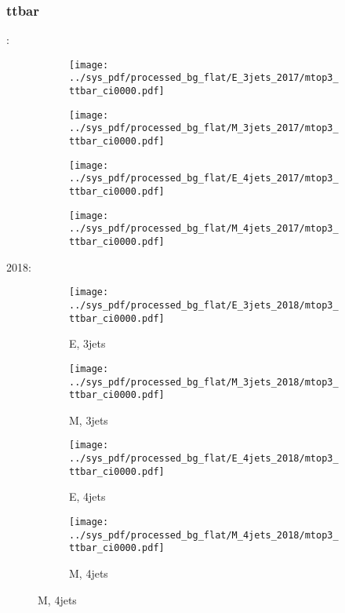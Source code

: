 \documentclass{beamer}
\begin{document}
\begin{frame}
\frametitle{ttbar}
\fontsize{5}{1}:
\begin{figure}
\centering
\begin{subfigure}[b]{0.24\textwidth}
\texttt{[image: ../sys\_pdf/processed\_bg\_flat/E\_3jets\_2017/mtop3\_ttbar\_ci0000.pdf]}
\end{subfigure}
\begin{subfigure}[b]{0.24\textwidth}
\texttt{[image: ../sys\_pdf/processed\_bg\_flat/M\_3jets\_2017/mtop3\_ttbar\_ci0000.pdf]}
\end{subfigure}
\begin{subfigure}[b]{0.24\textwidth}
\texttt{[image: ../sys\_pdf/processed\_bg\_flat/E\_4jets\_2017/mtop3\_ttbar\_ci0000.pdf]}
\end{subfigure}
\begin{subfigure}[b]{0.24\textwidth}
\texttt{[image: ../sys\_pdf/processed\_bg\_flat/M\_4jets\_2017/mtop3\_ttbar\_ci0000.pdf]}
\end{subfigure}
\end{figure}
2018:
\begin{figure}
\centering
\begin{subfigure}[b]{0.24\textwidth}
\texttt{[image: ../sys\_pdf/processed\_bg\_flat/E\_3jets\_2018/mtop3\_ttbar\_ci0000.pdf]}
\captionsetup{font=tiny}
\caption{E, 3jets}
\end{subfigure}
\begin{subfigure}[b]{0.24\textwidth}
\texttt{[image: ../sys\_pdf/processed\_bg\_flat/M\_3jets\_2018/mtop3\_ttbar\_ci0000.pdf]}
\captionsetup{font=tiny}
\caption{M, 3jets}
\end{subfigure}
\begin{subfigure}[b]{0.24\textwidth}
\texttt{[image: ../sys\_pdf/processed\_bg\_flat/E\_4jets\_2018/mtop3\_ttbar\_ci0000.pdf]}
\captionsetup{font=tiny}
\caption{E, 4jets}
\end{subfigure}
\begin{subfigure}[b]{0.24\textwidth}
\texttt{[image: ../sys\_pdf/processed\_bg\_flat/M\_4jets\_2018/mtop3\_ttbar\_ci0000.pdf]}
\captionsetup{font=tiny}
\caption{M, 4jets}
\end{subfigure}
\end{figure}
\end{frame}
\end{document}

